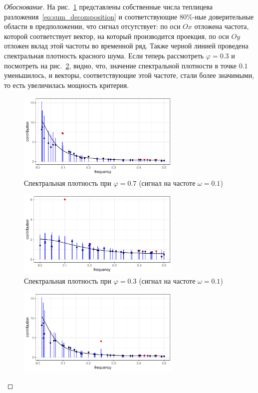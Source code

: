 \documentclass[specialist,
substylefile = spbu_report.rtx,
subf,href,colorlinks=true, 12pt]{disser}
\theoremstyle{definition}
\begin{document}
\begin{proof}[Обоснование]
		На рис.~\ref{fig:mcssa_spec_phi7} представлены собственные числа теплицева разложения~\eqref{eq:sum_decomposition} и соответствующие $80\%$-ные доверительные области в предположении, что сигнал отсутствует: по оси $Ox$ отложена частота, которой соответствует вектор, на который производится проекция, по оси $Oy$ отложен вклад этой частоты во временной ряд. Также черной линией проведена спектральная плотность красного шума. Если теперь рассмотреть $\varphi=0.3$ и посмотреть на рис.~\ref{fig:mcssa_spec_phi3}, видно, что, значение спектральной плотности в точке $0.1$ уменьшилось, и векторы, соответствующие этой частоте, стали более значимыми, то есть увеличилась мощность критерия.
		\begin{figure}[h]
			\centering
			\includegraphics[width=0.7\textwidth]{img/mcssa_spec_phi7.pdf}
			\caption{Спектральная плотность при $\varphi=0.7$ (сигнал на частоте $\omega=0.1$)}
			\label{fig:mcssa_spec_phi7}
		\end{figure}
		\begin{figure}[h]
			\centering
			\includegraphics[width=0.7\textwidth]{img/mcssa_spec_phi3.pdf}
			\caption{Спектральная плотность при $\varphi=0.3$ (сигнал на частоте $\omega=0.1$)}
			\label{fig:mcssa_spec_phi3}
		\end{figure}
		\begin{figure}[H]
			\centering
			\includegraphics[width=0.7\textwidth]{img/mcssa_spec_phi7_omega025.pdf}

\end{figure}
\end{proof}
\end{document}
